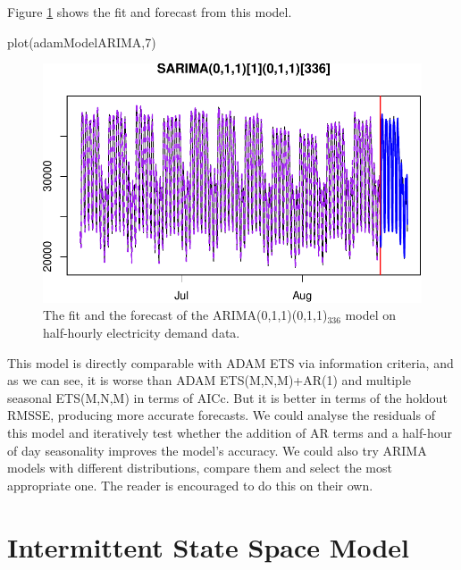 \documentclass[
]{book}
\newenvironment{Shaded}{\begin{snugshade}}{\end{snugshade}}
\newcommand{\DecValTok}[1]{\textcolor[rgb]{0.00,0.00,0.81}{#1}}
\newcommand{\FunctionTok}[1]{\textcolor[rgb]{0.00,0.00,0.00}{#1}}
\newcommand{\NormalTok}[1]{#1}
\theoremstyle{definition}
\theoremstyle{definition}
\theoremstyle{definition}
\theoremstyle{definition}
\theoremstyle{remark}
\begin{document}
Figure \ref{fig:adamModelARIMA} shows the fit and forecast from this model.

\begin{Shaded}
\begin{Highlighting}[]
\FunctionTok{plot}\NormalTok{(adamModelARIMA,}\DecValTok{7}\NormalTok{)}
\end{Highlighting}
\end{Shaded}

\begin{figure}
\centering
\includegraphics{Svetunkov--2022----ADAM_files/figure-latex/adamModelARIMA-1.pdf}
\caption{\label{fig:adamModelARIMA}The fit and the forecast of the ARIMA(0,1,1)(0,1,1)\(_336\) model on half-hourly electricity demand data.}
\end{figure}

This model is directly comparable with ADAM ETS via information criteria, and as we can see, it is worse than ADAM ETS(M,N,M)+AR(1) and multiple seasonal ETS(M,N,M) in terms of AICc. But it is better in terms of the holdout RMSSE, producing more accurate forecasts. We could analyse the residuals of this model and iteratively test whether the addition of AR terms and a half-hour of day seasonality improves the model's accuracy. We could also try ARIMA models with different distributions, compare them and select the most appropriate one. The reader is encouraged to do this on their own.

\hypertarget{ADAMIntermittent}{%
\chapter{Intermittent State Space Model}\label{ADAMIntermittent}}
\end{document}
